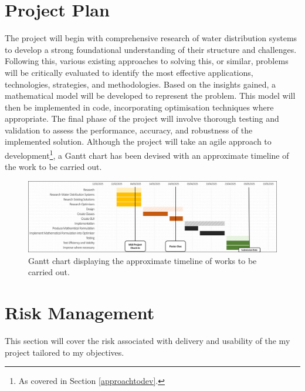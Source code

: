 \section{Project Plan}
The project will begin with comprehensive research of water distribution systems to develop a strong foundational understanding of their structure and challenges. Following this, various existing approaches to solving this, or similar, problems will be critically evaluated to identify the most effective applications, technologies, strategies, and methodologies. Based on the insights gained, a mathematical model will be developed to represent the problem. This model will then be implemented in code, incorporating optimisation techniques where appropriate. The final phase of the project will involve thorough testing and validation to assess the performance, accuracy, and robustness of the implemented solution. Although the project will take an agile approach to development\footnote{As covered in Section \ref{approachtodev}.}, a Gantt chart has been devised with an approximate timeline of the work to be carried out.

\begin{figure}[H]
    \centering
    \includegraphics[width=1\linewidth]{Chapter1/Figs/Raster/ganttchart.png}
    \caption{Gantt chart displaying the approximate timeline of works to be carried out.}
    \label{fig:ganttchart}
\end{figure}


\section{Risk Management}
This section will cover the risk associated with delivery and usability of the my project tailored to my objectives.

